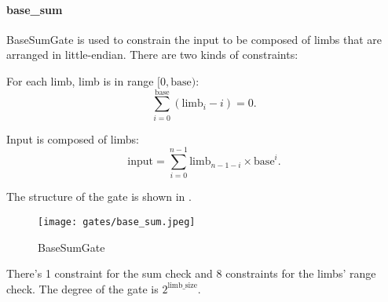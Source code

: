 \paragraph{base\_sum}

BaseSumGate is used to constrain the input to be composed of limbs that are arranged in little-endian. There are two kinds of constraints:

For each limb, limb is in range $[0, \text{base})$:
\[ \sum_{i=0}^{\text{base}}(\text{limb}_i - i) = 0. \]

Input is composed of limbs:
\[ \text{input} = \sum_{i=0}^{n-1} \text{limb}_{n-1-i} \times \text{base}^i. \]

The structure of the gate is shown in .
\begin{figure}[!ht]
    \centering
    \texttt{[image: gates/base\_sum.jpeg]}
    \caption{BaseSumGate}
    \label{fig:base-sum}
\end{figure}

There's 1 constraint for the sum check and 8 constraints for the limbs' range check. The degree of the gate is $2^{\text{limb\_size}}$.
